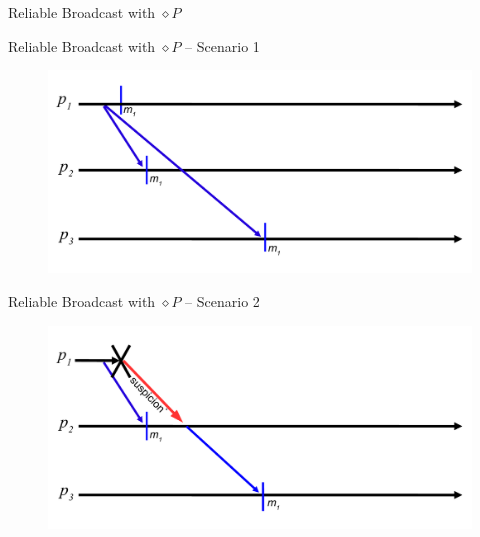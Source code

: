\begin{frame}[shrink]{Reliable Broadcast with $\diamond P$}


\begin{Procedure}
\caption{Reliable broadcast protocol executed by $p$}
\BlankLine
{}
\BlankLine
{}
\end{Procedure}

\end{frame}

\begin{frame}{Reliable Broadcast with $\diamond P$ -- Scenario 1}
	
\begin{figure}
\includegraphics[width=\textwidth]{figs/07/rb-diamond1}
\end{figure}
	
\end{frame}

\begin{frame}{Reliable Broadcast with $\diamond P$ -- Scenario 2}
	
\begin{figure}
\includegraphics[width=\textwidth]{figs/07/rb-diamond2}
\end{figure}

\end{frame}
	
